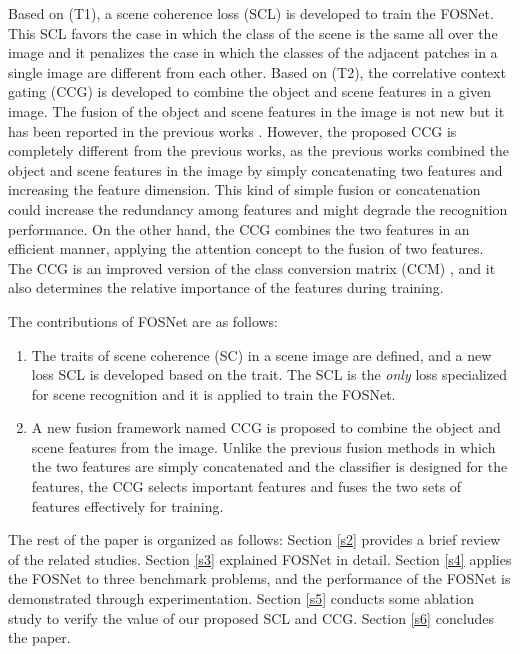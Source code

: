 \documentclass[journal,comsoc]{IEEEtran}
\begin{document}
Based on (T1), a scene coherence loss (SCL) is developed to train the FOSNet. This SCL favors the case in which the class of the scene is the same all over the image and it penalizes the case in which the classes of the adjacent patches in a single image are different from each other. Based on (T2), the correlative context gating (CCG) is developed to combine the object and scene features in a given image. The fusion of the object and scene features in the image is not new but it has been reported in the previous works \cite{b7,b9}. However, the proposed CCG is completely different from the previous works, as the previous works combined the object and scene features in the image by simply concatenating two features and increasing the feature dimension. This kind of simple fusion or concatenation could increase the redundancy among features and might degrade the recognition performance. On the other hand, the CCG combines the two features in an efficient manner, applying the attention concept to the fusion of two features. The CCG is an improved version of the class conversion matrix (CCM) \cite{b21}, and it also determines the relative importance of the features during training. 

The contributions of FOSNet are as follows:

\begin{enumerate}
\item	The traits of scene coherence (SC) in a scene image are defined, and a new loss SCL is developed based on the trait. The SCL is the \textit{only} loss specialized for scene recognition and it is applied to train the FOSNet. 

\item	A new fusion framework named CCG is proposed to combine the object and scene features from the image. Unlike the previous fusion methods in which the two features are simply concatenated and the classifier is designed for the features, the CCG selects important features and fuses the two sets of features effectively for training.
\end{enumerate}

The rest of the paper is organized as follows: Section \ref{s2} provides a brief review of the related studies. Section \ref{s3} explained FOSNet in detail. Section \ref{s4} applies the FOSNet to three benchmark problems, and the performance of the FOSNet is demonstrated through experimentation. Section \ref{s5} conducts some ablation study to verify the value of our proposed SCL and CCG. Section \ref{s6} concludes the paper.
\end{document}
